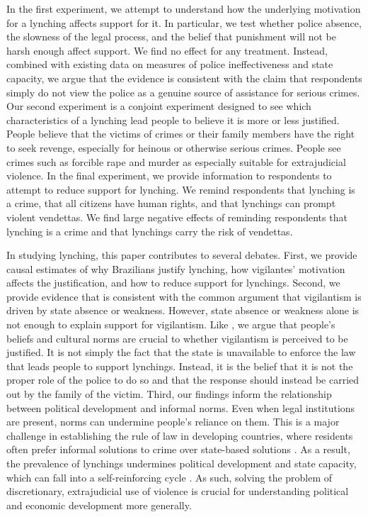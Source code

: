 \documentclass[12pt,ansiapaper]{article}
\begin{document}
In the first experiment, we attempt to understand how the underlying motivation for a lynching affects support for it. In particular, we test whether police absence, the slowness of the legal process, and the belief that punishment will not be harsh enough affect support. We find no effect for any treatment. Instead, combined with existing data on measures of police ineffectiveness and state capacity, we argue that the evidence is consistent with the claim that respondents simply do not view the police as a genuine source of assistance for serious crimes. Our second experiment is a conjoint experiment designed to see which characteristics of a lynching lead people to believe it is more or less justified. People believe that the victims of crimes or their family members have the right to seek revenge, especially for heinous or otherwise serious crimes. People see crimes such as forcible rape and murder as especially suitable for extrajudicial violence. In the final experiment, we provide information to respondents to attempt to reduce support for lynching. We remind respondents that lynching is a crime, that all citizens have human rights, and that lynchings can prompt violent vendettas. We find large negative effects of reminding respondents that lynching is a crime and that lynchings carry the risk of vendettas.

In studying lynching, this  paper contributes to several debates. First, we provide causal estimates of why Brazilians justify lynching, how vigilantes' motivation affects the justification, and how to reduce support for lynchings. Second, we provide evidence that is consistent with the common argument that vigilantism is driven by state absence or weakness. However, state absence or weakness alone is not enough to explain support for vigilantism. Like \cite{jung2020lynching}, we argue that people's beliefs and cultural norms are crucial to whether vigilantism is perceived to be justified. It is not simply the fact that the state is unavailable to enforce the law that leads people to support lynchings. Instead, it is the belief that it is not the proper role of the police to do so and that the response should instead be carried out by the family of the victim. Third, our findings inform the relationship between political development and informal norms. Even when legal institutions are present, norms  can undermine people's reliance on them. This is a major challenge in establishing the rule of law in developing countries, where residents often prefer informal solutions to crime over state-based solutions \citep[10]{blair2020peacekeeping}. As a result, the prevalence of lynchings undermines political development and state capacity, which can fall into a self-reinforcing cycle \citep{jung2020lynching}. As such, solving the problem of discretionary, extrajudicial use of violence is crucial for understanding political and economic development more generally. 
\end{document}
